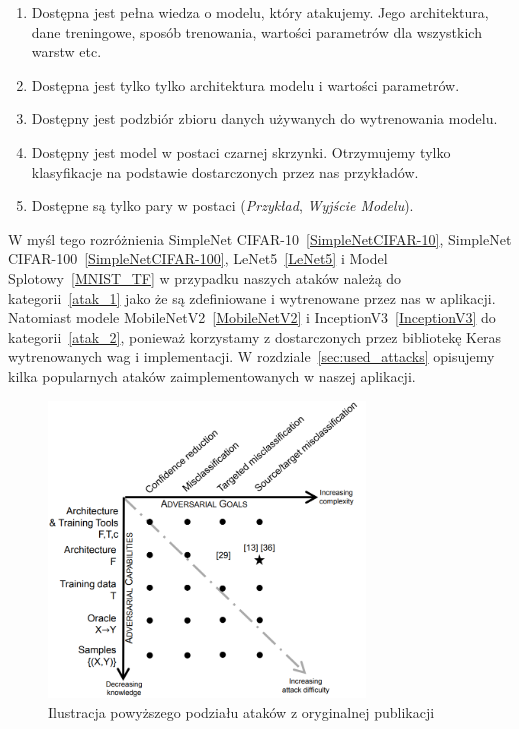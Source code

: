 \documentclass[
    left=2.5cm,         %
    right=2.5cm,        %
    top=2.5cm,          %
    bottom=3cm,         %
    bindingoffset=6mm,  %
    nohyphenation=false %
]{eiti/eiti-thesis}
\begin{document}
\begin{enumerate}
    \item \label{atak_1} Dostępna jest pełna wiedza o modelu, który atakujemy. Jego architektura, dane treningowe, sposób trenowania, wartości parametrów dla wszystkich warstw etc.
    \item \label{atak_2} Dostępna jest tylko tylko architektura modelu i wartości parametrów.
    \item Dostępny jest podzbiór zbioru danych używanych do wytrenowania modelu.
    \item Dostępny jest model w postaci czarnej skrzynki. Otrzymujemy tylko klasyfikacje na podstawie dostarczonych przez nas przykładów.
    \item Dostępne są tylko pary w postaci (\textit{Przykład}, \textit{Wyjście Modelu}).
\end{enumerate}
W myśl tego rozróżnienia SimpleNet CIFAR-10~\ref{SimpleNetCIFAR-10}, SimpleNet CIFAR-100~\ref{SimpleNetCIFAR-100},
LeNet5~\ref{LeNet5} i Model Splotowy~\ref{MNIST_TF} w przypadku naszych ataków należą do kategorii~\ref{atak_1} jako że są zdefiniowane i wytrenowane przez nas w aplikacji.
Natomiast modele MobileNetV2~\ref{MobileNetV2} i InceptionV3~\ref{InceptionV3} do kategorii~\ref{atak_2}, ponieważ korzystamy z dostarczonych przez bibliotekę Keras wytrenowanych wag i implementacji.
W rozdziale~\ref{sec:used_attacks} opisujemy kilka popularnych ataków zaimplementowanych w naszej aplikacji.

\begin{figure}[H]
    \begin{center}
        \includegraphics[width=0.75\textwidth]{eiti/attacks_taxonomy.png}
    \end{center}
    \caption{Ilustracja powyższego podziału ataków z oryginalnej publikacji~\cite{DBLP:journals/corr/PapernotMJFCS15}}
\end{figure}
\end{document}
